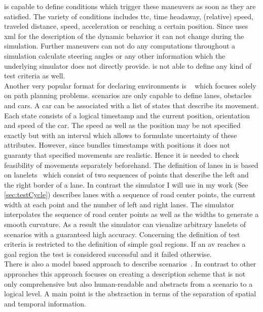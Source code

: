 \openscenario{} is capable to define conditions which trigger these maneuvers as soon as they are satisfied.
The variety of conditions includes \gls{ttc}, time headaway, (relative) speed, traveled distance, speed, acceleration or reaching a certain position.
Since \openscenario{} uses \gls{xml} for the description of the dynamic behavior it can not change during the simulation.
Further maneuvers can not do any computations throughout a simulation \eg{} calculate steering angles or any other information which the underlying simulator does not directly provide.
\openscenario{} is not able to define any kind of test criteria as well.\\
Another very popular format for declaring environments is \commonroad{}~\cite{commonRoad} which focuses solely on path planning problems.
\commonroad{} scenarios are only capable to define lanes, obstacles and cars.
A car can be associated with a list of states that describe its movement.
Each state consists of a logical timestamp and the current position, orientation and speed of the car.
The speed as well as the position may be not specified exactly but with an interval which allows to formulate uncertainty of these attributes.
However, since \commonroad{} bundles timestamps with positions it does not guaranty that specified movements are realistic.
Hence it is needed to check feasibility of movements separately beforehand.
The definition of lanes in \commonroad{} is based on lanelets~\cite{lanelets} which consist of two sequences of points that describe the left and the right border of a lane.
In contrast the simulator I will use in my work (See \cref{sec:testCycle}) describes lanes with a sequence of road center points, the current width at each point and the number of left and right lanes.
The simulator interpolates the sequence of road center points as well as the widths to generate a smooth curvature.
As a result the simulator can visualize arbitrary lanelets of \commonroad{} scenarios with a guaranteed high accuracy.
Concerning the definition of test criteria \commonroad{} is restricted to the definition of simple goal regions.
If an \gls{av} reaches a goal region the test is considered successful and it failed otherwise.\\
There is also a model based approach to describe scenarios~\cite{modelBasedDescription}.
In contrast to other approaches this approach focuses on creating a description scheme that is not only comprehensive but also human-readable and abstracts from a scenario to a logical level.
A main point is the abstraction in terms of the separation of spatial and temporal information.
